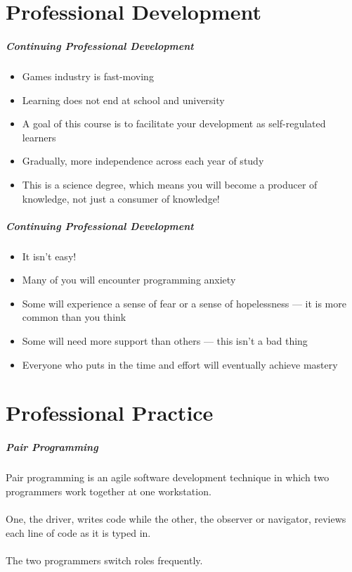 \part{Professional Development}
\frame{\partpage}

\begin{frame}
	\frametitle{Continuing Professional Development}
	
	\begin{itemize}
		\item Games industry is fast-moving
		\item Learning does not end at school and university
		\item A goal of this course is to facilitate your development as self-regulated learners
		\item Gradually, more independence across each year of study
		\item This is a science degree, which means you will become a producer of knowledge, not just a consumer of knowledge!
	\end{itemize}
\end{frame}

\begin{frame}
	\frametitle{Continuing Professional Development}
	
	\begin{itemize}
		\item It isn't easy!
		\item Many of you will encounter programming anxiety
		\item Some will experience a sense of fear or a sense of hopelessness --- it is more common than you think
		\item Some will need more support than others --- this isn't a bad thing
		\item Everyone who puts in the time and effort will eventually achieve mastery
	\end{itemize}
\end{frame}


\part{Professional Practice}
\frame{\partpage}

\begin{frame}
	\frametitle{Pair Programming}
		
	Pair programming is an agile software development technique in which two programmers work together 
	at one workstation. 
	\\~\\
	One, the driver, writes code while the other, the observer or navigator, reviews 
	each line of code as it is typed in. 
	\\~\\
	The two programmers switch roles frequently.
	
\end{frame}

